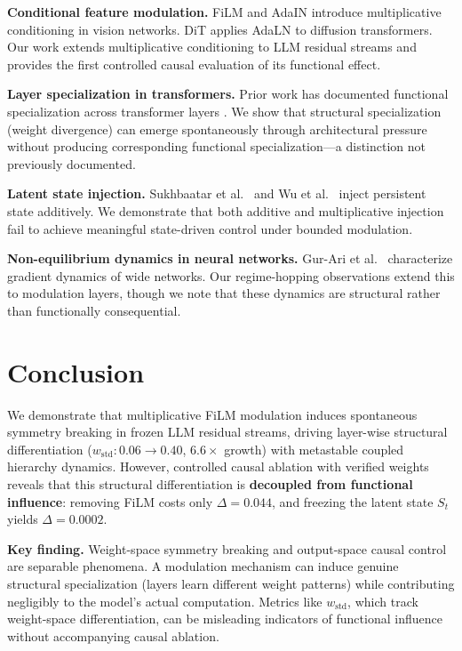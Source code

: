 \documentclass[11pt,a4paper]{article}
\newcommand{\St}{S_t}
\begin{document}
\textbf{Conditional feature modulation.} FiLM \cite{perez2018film} and AdaIN
\cite{huang2017arbitrary} introduce multiplicative conditioning in vision networks.
DiT \cite{peebles2023scalable} applies AdaLN to diffusion transformers. Our work
extends multiplicative conditioning to LLM residual streams and provides the first
controlled causal evaluation of its functional effect.

\textbf{Layer specialization in transformers.} Prior work has documented functional
specialization across transformer layers \cite{tenney2019bert, clark2019does,
rogers2020primer}. We show that structural specialization (weight divergence) can
emerge spontaneously through architectural pressure without producing corresponding
functional specialization---a distinction not previously documented.

\textbf{Latent state injection.} Sukhbaatar et al.\ \cite{sukhbaatar2019augmenting}
and Wu et al.\ \cite{wu2022memorizing} inject persistent state additively. We
demonstrate that both additive and multiplicative injection fail to achieve
meaningful state-driven control under bounded modulation.

\textbf{Non-equilibrium dynamics in neural networks.} Gur-Ari et al.\
\cite{gurari2018gradient} characterize gradient dynamics of wide networks. Our
regime-hopping observations extend this to modulation layers, though we note that
these dynamics are structural rather than functionally consequential.

\section{Conclusion}

We demonstrate that multiplicative FiLM modulation induces spontaneous symmetry
breaking in frozen LLM residual streams, driving layer-wise structural
differentiation ($w_{\mathrm{std}}: 0.06 \to 0.40$, $6.6\times$ growth) with
metastable coupled hierarchy dynamics. However, controlled causal ablation with
verified weights reveals that this structural differentiation is \textbf{decoupled
from functional influence}: removing FiLM costs only $\Delta = 0.044$, and freezing
the latent state $\St$ yields $\Delta = 0.0002$.

\textbf{Key finding.} Weight-space symmetry breaking and output-space causal control
are separable phenomena. A modulation mechanism can induce genuine structural
specialization (layers learn different weight patterns) while contributing negligibly
to the model's actual computation. Metrics like $w_{\mathrm{std}}$, which track
weight-space differentiation, can be misleading indicators of functional influence
without accompanying causal ablation.
\end{document}

